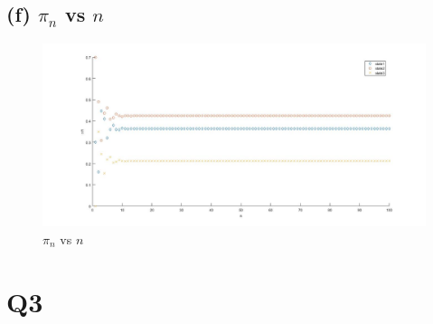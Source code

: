 \documentclass[a4paper,11pt]{article}
\begin{document}
\subsection*{(f) $\pi_n$  vs $n$}
\begin{figure}[htbp]
        \includegraphics[scale=0.35]{2f}
        \caption{$\pi_n$ vs $n$}
\end{figure}
\newpage 
\section*{Q3}
\end{document}
